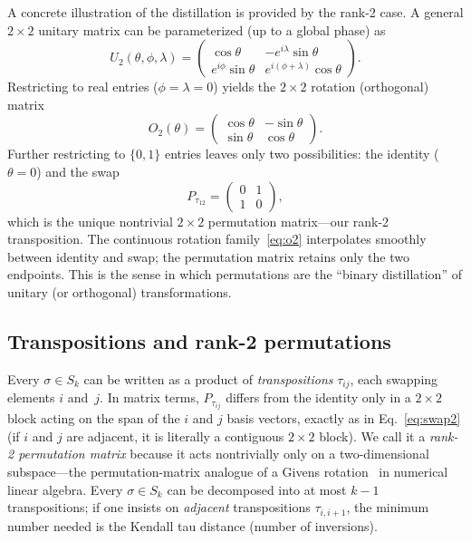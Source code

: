 \documentclass[
  twocolumn,
  aps,
  pra,
  showkeys,
  amsmath,amssymb,
  longbibliography
]{revtex4-2}
\begin{document}
A concrete illustration of the distillation is provided by the
rank-2 case.
A general $2\times 2$ unitary matrix can be parameterized
(up to a global phase) as
\begin{equation}
U_2(\theta,\phi,\lambda) =
\begin{pmatrix}
\cos\theta & -e^{i\lambda}\sin\theta \\
e^{i\phi}\sin\theta & e^{i(\phi+\lambda)}\cos\theta
\end{pmatrix}.
\label{eq:u2}
\end{equation}
Restricting to real entries ($\phi=\lambda=0$) yields the
$2\times 2$ rotation (orthogonal) matrix
\begin{equation}
O_2(\theta) =
\begin{pmatrix}
\cos\theta & -\sin\theta \\
\sin\theta & \cos\theta
\end{pmatrix}.
\label{eq:o2}
\end{equation}
Further restricting to $\{0,1\}$ entries leaves only two
possibilities: the identity ($\theta=0$) and the swap
\begin{equation}
P_{\tau_{12}} =
\begin{pmatrix}
0 & 1 \\
1 & 0
\end{pmatrix},
\label{eq:swap2}
\end{equation}
which is the unique nontrivial $2\times 2$ permutation
matrix---our rank-2 transposition.
The continuous rotation family~\eqref{eq:o2} interpolates
smoothly between identity and swap; the permutation matrix
retains only the two endpoints.
This is the sense in which permutations are the ``binary
distillation'' of unitary (or orthogonal) transformations.

\subsection{Transpositions and rank-2 permutations}

Every $\sigma\in S_k$ can be written as a product of
\emph{transpositions} $\tau_{ij}$, each swapping elements
$i$ and~$j$.
In matrix terms, $P_{\tau_{ij}}$ differs from the identity only
in a $2\times 2$ block acting on the span of the $i$ and $j$ basis vectors,
exactly as in Eq.~\eqref{eq:swap2} (if $i$ and $j$ are adjacent, it is literally a contiguous $2\times 2$ block).
We call it a \emph{rank-2 permutation matrix} because it acts
nontrivially only on a two-dimensional subspace---the
permutation-matrix analogue of a Givens
rotation~\cite{golub-vanloan-13} in numerical linear algebra.
Every $\sigma\in S_k$ can be decomposed into at most $k-1$
transpositions; if one insists on \emph{adjacent}
transpositions $\tau_{i,i+1}$, the minimum number needed is
the Kendall tau distance (number of inversions).
\end{document}
